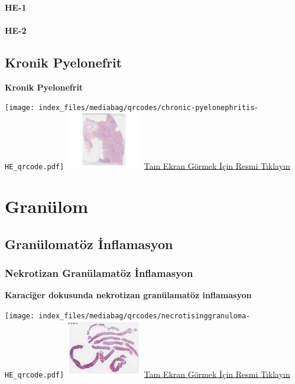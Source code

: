 \documentclass[
  letterpaper,
  DIV=11,
  numbers=noendperiod]{scrreprt}
\begin{document}
\hypertarget{he-1-3}{%
\subsubsection{HE-1}\label{he-1-3}}

\hypertarget{he-2-3}{%
\subsubsection{HE-2}\label{he-2-3}}

\hypertarget{sec-kronik-pyelonefrit}{%
\section{Kronik Pyelonefrit}\label{sec-kronik-pyelonefrit}}

\textbf{Kronik Pyelonefrit}

\texttt{[image: index\_files/mediabag/qrcodes/chronic-pyelonephritis-HE\_qrcode.pdf]}
\href{https://images.patolojiatlasi.com/chronic-pyelonephritis/HE.html}{\includegraphics[width=0.25\textwidth,height=\textheight]{./screenshots/thumbnail_chronic-pyelonephritis.png}}
\href{https://images.patolojiatlasi.com/chronic-pyelonephritis/HE.html}{Tam
Ekran Görmek İçin Resmi Tıklayın}

\hypertarget{sec-granulom}{%
\chapter{Granülom}\label{sec-granulom}}

\hypertarget{sec-granulomatoz-inflamasyon}{%
\section{Granülomatöz İnflamasyon}\label{sec-granulomatoz-inflamasyon}}

\hypertarget{sec-nekrotizan-granulamatoz-inflamasyon}{%
\subsection{Nekrotizan Granülamatöz
İnflamasyon}\label{sec-nekrotizan-granulamatoz-inflamasyon}}

\textbf{Karaciğer dokusunda nekrotizan granülamatöz inflamasyon}

\texttt{[image: index\_files/mediabag/qrcodes/necrotisinggranuloma-HE\_qrcode.pdf]}
\href{https://images.patolojiatlasi.com/necrotisinggranuloma/HE.html}{\includegraphics[width=0.25\textwidth,height=\textheight]{./screenshots/thumbnail_necrotisinggranuloma.png}}
\href{https://images.patolojiatlasi.com/necrotisinggranuloma/HE.html}{Tam
Ekran Görmek İçin Resmi Tıklayın}
\end{document}
